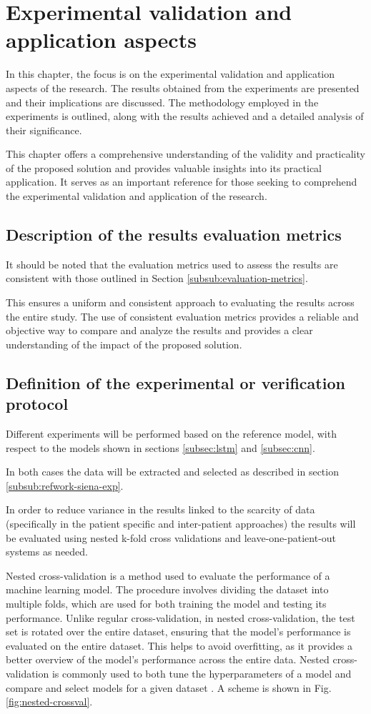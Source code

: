\chapter{Experimental validation and application aspects}
In this chapter, the focus is on the experimental validation and application aspects of the research. The results obtained from the experiments are presented and their implications are discussed. The methodology employed in the experiments is outlined, along with the results achieved and a detailed analysis of their significance. 

This chapter offers a comprehensive understanding of the validity and practicality of the proposed solution and provides valuable insights into its practical application. It serves as an important reference for those seeking to comprehend the experimental validation and application of the research.

\section{Description of the results evaluation metrics}
It should be noted that the evaluation metrics used to assess the results are consistent with those outlined in Section \ref{subsub:evaluation-metrics}. 

This ensures a uniform and consistent approach to evaluating the results across the entire study. 
The use of consistent evaluation metrics provides a reliable and objective way to compare and analyze the results and provides a clear understanding of the impact of the proposed solution.

\section{Definition of the experimental or verification protocol}
Different experiments will be performed based on the reference model, with respect to the models shown in sections \ref{subsec:lstm} and \ref{subsec:cnn}.

In both cases the data will be extracted and selected as described in section \ref{subsub:refwork-siena-exp}.

In order to reduce variance in the results linked to the scarcity of data (specifically in the patient specific and inter-patient approaches) the results will be evaluated using nested k-fold cross validations and leave-one-patient-out systems as needed.

Nested cross-validation is a method used to evaluate the performance of a machine learning model. The procedure involves dividing the dataset into multiple folds, which are used for both training the model and testing its performance. Unlike regular cross-validation, in nested cross-validation, the test set is rotated over the entire dataset, ensuring that the model's performance is evaluated on the entire dataset. This helps to avoid overfitting, as it provides a better overview of the model's performance across the entire data. Nested cross-validation is commonly used to both tune the hyperparameters of a model and compare and select models for a given dataset \cite{jacopo_repossi_tutorial_2022}. A scheme is shown in Fig. \ref{fig:nested-crossval}.

